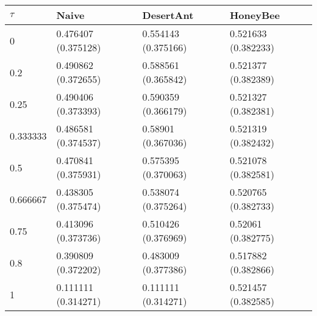 \begin{tabular} {|l|l|l|l|}
\hline
$\tau$ & Naive & DesertAnt & HoneyBee \\
\hline
0 & 0.476407 (0.375128)  & 0.554143 (0.375166)  & 0.521633 (0.382233)  \\
0.2 & 0.490862 (0.372655)  & 0.588561 (0.365842)  & 0.521377 (0.382389)  \\
0.25 & 0.490406 (0.373393)  & 0.590359 (0.366179)  & 0.521327 (0.382381)  \\
0.333333 & 0.486581 (0.374537)  & 0.58901 (0.367036)  & 0.521319 (0.382432)  \\
0.5 & 0.470841 (0.375931)  & 0.575395 (0.370063)  & 0.521078 (0.382581)  \\
0.666667 & 0.438305 (0.375474)  & 0.538074 (0.375264)  & 0.520765 (0.382733)  \\
0.75 & 0.413096 (0.373736)  & 0.510426 (0.376969)  & 0.52061 (0.382775)  \\
0.8 & 0.390809 (0.372202)  & 0.483009 (0.377386)  & 0.517882 (0.382866)  \\
1 & 0.111111 (0.314271)  & 0.111111 (0.314271)  & 0.521457 (0.382585)  \\
\hline
\end{tabular}
